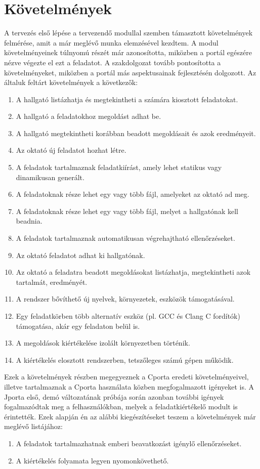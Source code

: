 \section{Követelmények}\label{section:requirements}
A tervezés első lépése a tervezendő modullal szemben támasztott követelmények felmérése, amit a már meglévő munka elemzésével kezdtem.
A modul követelményeinek túlnyomú részét \cite{Ory13} már azonosította, miközben a portál egészére nézve végezte el ezt a feladatot.
A \cite{Kalman14} szakdolgozat tovább pontosította a követelményeket, miközben a portál más aspektusainak fejlesztésén dolgozott.
Az általuk feltárt követelmények a következők:
\begin{enumerate}
    \item A hallgató listázhatja és megtekintheti a számára kiosztott feladatokat.
    \item A hallgató a feladatokhoz megoldást adhat be.
    \item A hallgató megtekintheti korábban beadott megoldásait és azok eredményeit.
    \item Az oktató új feladatot hozhat létre.
    \item \label{req:specification} A feladatok tartalmaznak feladatkiírást, amely lehet statikus vagy dinamikusan generált.
    \item A feladatoknak része lehet egy vagy több fájl, amelyeket az oktató ad meg.
    \item A feladatoknak része lehet egy vagy több fájl, melyet a hallgatónak kell beadnia.
    \item A feladatok tartalmaznak automatikusan végrehajtható ellenőrzéseket.
    \item Az oktató feladatot adhat ki hallgatónak.
    \item Az oktató a feladatra beadott megoldásokat listázhatja, megtekintheti azok tartalmát, eredményét.
    \item A rendszer bővíthető új nyelvek, környezetek, eszközök támogatásával.
    \item Egy feladatkörben több alternatív eszköz (pl. GCC és Clang C fordítók) támogatása, akár egy feladaton belül is.
    \item \label{req:isolation} A megoldások kiértékelése izolált környezetben történik.
    \item \label{req:distributed} A kiértékelés elosztott rendszerben, tetszőleges számú gépen működik.
\end{enumerate}
Ezek a követelmények részben megegyeznek a Cporta eredeti követelményeivel, illetve tartalmaznak a Cporta használata közben megfogalmazott igényeket is.
A Jporta első, demó változatának próbája során azonban további igények fogalmazódtak meg a felhasználókban, melyek a feladatkiértékelő modult is érintették.
Ezek alapján én az alábbi kiegészítéseket teszem a követelmények már meglévő listájához:
\begin{enumerate}[resume]
    \item \label{req:manual} A feladatok tartalmazhatnak emberi beavatkozást igénylő ellenőrzéseket.
    \item \label{req:traceability} A kiértékelés folyamata legyen nyomonkövethető.
\end{enumerate}

